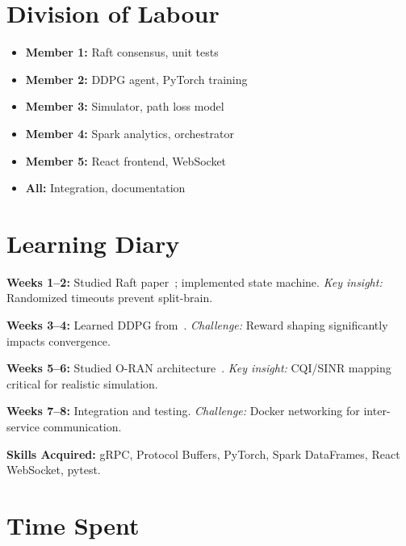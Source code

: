 \documentclass[journal]{IEEEtran}
\begin{document}
\section*{Division of Labour}

\begin{itemize}
    \item \textbf{Member 1:} Raft consensus, unit tests
    \item \textbf{Member 2:} DDPG agent, PyTorch training
    \item \textbf{Member 3:} Simulator, path loss model
    \item \textbf{Member 4:} Spark analytics, orchestrator
    \item \textbf{Member 5:} React frontend, WebSocket
    \item \textbf{All:} Integration, documentation
\end{itemize}

\section*{Learning Diary}

\textbf{Weeks 1--2:} Studied Raft paper~\cite{raft2014}; implemented state machine. \textit{Key insight:} Randomized timeouts prevent split-brain.

\textbf{Weeks 3--4:} Learned DDPG from~\cite{ddpg2016}. \textit{Challenge:} Reward shaping significantly impacts convergence.

\textbf{Weeks 5--6:} Studied O-RAN architecture~\cite{oran2020architecture}. \textit{Key insight:} CQI/SINR mapping critical for realistic simulation.

\textbf{Weeks 7--8:} Integration and testing. \textit{Challenge:} Docker networking for inter-service communication.

\textbf{Skills Acquired:} gRPC, Protocol Buffers, PyTorch, Spark DataFrames, React WebSocket, pytest.

\section*{Time Spent}
\end{document}
